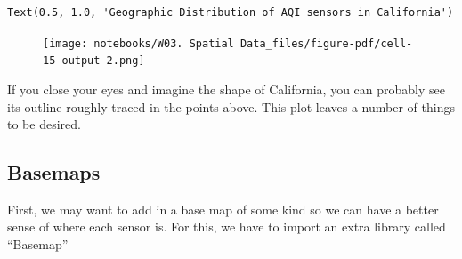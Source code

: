 \documentclass[
  letterpaper,
  DIV=11,
  numbers=noendperiod]{scrreprt}
\begin{document}
\begin{verbatim}
Text(0.5, 1.0, 'Geographic Distribution of AQI sensors in California')
\end{verbatim}

\begin{figure}[H]

{\centering \texttt{[image: notebooks/W03. Spatial Data\_files/figure-pdf/cell-15-output-2.png]}

}

\end{figure}

If you close your eyes and imagine the shape of California, you can
probably see its outline roughly traced in the points above. This plot
leaves a number of things to be desired.

\hypertarget{basemaps}{%
\subsection{Basemaps}\label{basemaps}}

First, we may want to add in a base map of some kind so we can have a
better sense of where each sensor is. For this, we have to import an
extra library called ``Basemap''
\end{document}
